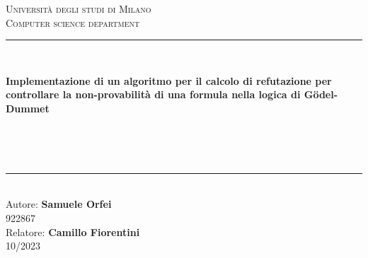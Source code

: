 \documentclass{oist}
\begin{document}
\pagestyle{empty}
\begin{titlepage}
    \begin{center}
        \vfill
        {\large \scshape Università degli studi di Milano}\\[0.1cm]
        {\large \scshape Computer science department}\\[0.5cm]
        \rule{\textwidth}{1.5pt}\\[0cm]
        {\huge \bfseries  Implementazione di un algoritmo per il calcolo di refutazione per controllare la non-provabilità di una formula nella logica di G\"odel-Dummet \par \ }\\[-0.5cm]
        \rule{\textwidth}{1.5pt}\\[2.5cm]
        {\hfill \large Autore: \textbf{Samuele Orfei}} \\
        \vspace{0.1cm}
        {\hfill \large 922867} \\
        \vspace{0.5cm}
        {\hfill \large Relatore: \textbf{Camillo Fiorentini}} \\
        \vspace{1cm}
        \hfill  10/2023
    \end{center}
\end{titlepage}
\end{document}
